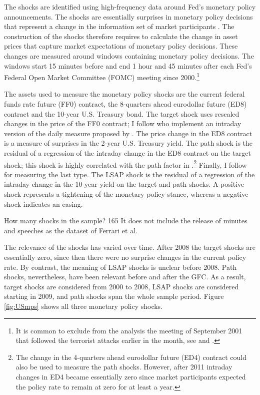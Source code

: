 {The shocks are identified using high-frequency data around Fed's monetary policy announcements.
The shocks are essentially surprises in monetary policy decisions that represent a change in the information set of market participants \citep{GurkaynakWright:2013,NakamuraSteinsson:2018JEP}.
The construction of the shocks therefore requires to calculate the change in asset prices that capture market expectations of monetary policy decisions.
These changes are measured around windows containing monetary policy decisions.
The windows start 15 minutes before and end 1 hour and 45 minutes after each Fed's Federal Open Market Committee (FOMC) meeting since 2000.\footnote{ It is common to exclude from the analysis the meeting of September 2001 that followed the terrorist attacks earlier in the month, see \cite{GSS:2005a} and \cite{NakamuraSteinsson:2018JEP}.}

The assets used to measure the monetary policy shocks are the current federal funds rate future (FF0) contract, the 8-quarters ahead eurodollar future (ED8) contract and the 10-year U.S. Treasury bond.
The target shock uses rescaled changes in the price of the FF0 contract; I follow \cite{GSS:2005a} who implement an intraday version of the daily measure proposed by \cite{Kuttner:2001}.
The price change in the ED8 contract is a measure of surprises in the 2-year U.S. Treasury yield.
The path shock is the residual of a regression of the intraday change in the ED8 contract on the target shock; this shock is highly correlated with the path factor in \cite{GSS:2005a}.\footnote{ The change in the 4-quarters ahead eurodollar future (ED4) contract could also be used to measure the path shocks. However, after 2011 intraday changes in ED4 became essentially zero since market participants expected the policy rate to remain at zero for at least a year.}
Finally, I follow \cite{Swanson:2018} for measuring the last type. %
The LSAP shock is the residual of a regression of the intraday change in the 10-year yield on the target and path shocks.
A positive shock represents a tightening of the monetary policy stance, whereas a negative shock indicates an easing.

How many shocks in the sample? 165
It does not include the release of minutes and speeches as the dataset of Ferrari et al.

The relevance of the shocks has varied over time.
After 2008 the target shocks are essentially zero, since then there were no surprise changes in the current policy rate.
By contrast, the meaning of LSAP shocks is unclear before 2008.
Path shocks, nevertheless, have been relevant before and after the GFC.
As a result, target shocks are considered from 2000 to 2008, LSAP shocks are considered starting in 2009, and path shocks span the whole sample period.
Figure \ref{fig:USmps} shows all three monetary policy shocks.


}
